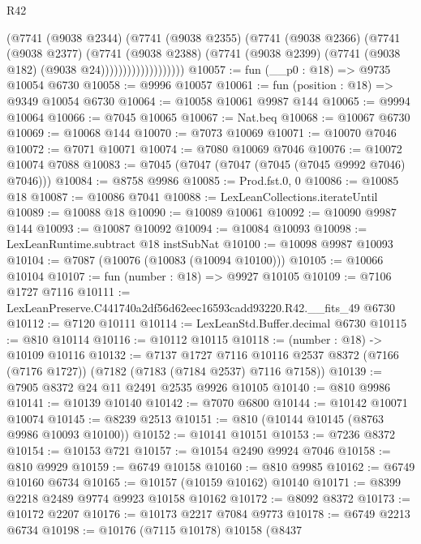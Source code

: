 \begin{lexlean}{R42}
\begin{coremodule}
{                          (@7741
                            (@9038 @2344)
                            (@7741
                              (@9038 @2355)
                              (@7741
                                (@9038 @2366)
                                (@7741
                                  (@9038 @2377)
                                  (@7741
                                    (@9038 @2388)
                                    (@7741
                                      (@9038 @2399)
                                      (@7741 (@9038 @182) (@9038 @24)))))))))))))))))))
@10057 := fun (__p0 : @18) => @9735 @10054 @6730
@10058 := @9996 @10057
@10061 := fun (position : @18) => @9349 @10054 @6730
@10064 := @10058 @10061 @9987 @144
@10065 := @9994 @10064
@10066 := @7045 @10065
@10067 := Nat.beq
@10068 := @10067 @6730
@10069 := @10068 @144
@10070 := @7073 @10069
@10071 := @10070 @7046
@10072 := @7071 @10071
@10074 := @7080 @10069 @7046
@10076 := @10072 @10074 @7088
@10083 := @7045 (@7047 (@7047 (@7045 (@7045 @9992 @7046) @7046)))
@10084 := @8758 @9986
@10085 := Prod.fst.{0, 0}
@10086 := @10085 @18
@10087 := @10086 @7041
@10088 := LexLeanCollections.iterateUntil
@10089 := @10088 @18
@10090 := @10089 @10061
@10092 := @10090 @9987 @144
@10093 := @10087 @10092
@10094 := @10084 @10093
@10098 := LexLeanRuntime.subtract @18 instSubNat
@10100 := @10098 @9987 @10093
@10104 := @7087 (@10076 (@10083 (@10094 @10100)))
@10105 := @10066 @10104
@10107 := fun (number : @18) => @9927 @10105
@10109 := @7106 @1727 @7116
@10111 := LexLeanPreserve.C441740a2df56d62eec16593cadd93220.R42.__fits_49 @6730
@10112 := @7120 @10111
@10114 := LexLeanStd.Buffer.decimal @6730
@10115 := @810 @10114
@10116 := @10112 @10115
@10118 := (number : @18) -> @10109 @10116
@10132 := @7137
    @1727
    @7116
    @10116
    @2537
    @8372
    (@7166 (@7176 @1727))
    (@7182 (@7183 (@7184 @2537) @7116 @7158))
@10139 := @7905 @8372 @24 @11 @2491 @2535 @9926 @10105
@10140 := @810 @9986
@10141 := @10139 @10140
@10142 := @7070 @6800
@10144 := @10142 @10071 @10074
@10145 := @8239 @2513
@10151 := @810 (@10144 @10145 (@8763 @9986 @10093 @10100))
@10152 := @10141 @10151
@10153 := @7236 @8372
@10154 := @10153 @721
@10157 := @10154 @2490 @9924 @7046
@10158 := @810 @9929
@10159 := @6749 @10158
@10160 := @810 @9985
@10162 := @6749 @10160 @6734
@10165 := @10157 (@10159 @10162) @10140
@10171 := @8399 @2218 @2489 @9774 @9923 @10158 @10162
@10172 := @8092 @8372
@10173 := @10172 @2207
@10176 := @10173 @2217 @7084 @9773
@10178 := @6749 @2213 @6734
@10198 := @10176
    (@7115 @10178)
    @10158
    (@8437
}
\end{coremodule}
\end{lexlean}
